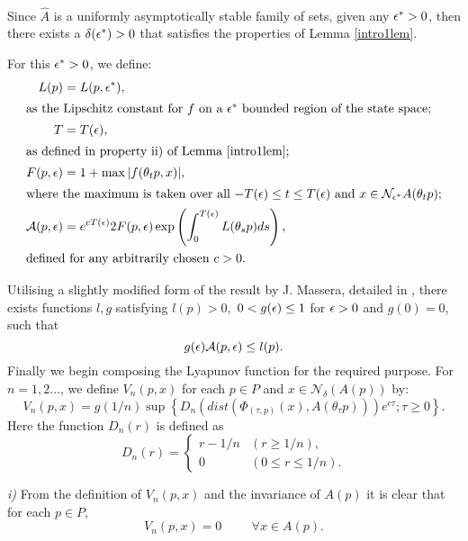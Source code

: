 \begin{prf} \hfill \\
  Since $\hat{A}$ is a uniformly asymptotically stable family of sets, given any
$\epsilon^* > 0$, then there exists a $\delta(\epsilon^*) > 0$ that satisfies the properties
of Lemma \ref{intro1lem}.

For this $\epsilon^*>0$, we define:
\begin{align*}
  L(p) &= L(p, \epsilon^*), \\
\intertext{as the Lipschitz constant for $f$ on a $\epsilon^*$ bounded region of
the state space;}
 T &= T( \epsilon ), \\
\intertext{as defined in property ii) of Lemma \ref{intro1lem};}
  F(p, \epsilon)  &= 1 + \max |f(\theta_t p,x)|, \\
\intertext{where the maximum is taken over all $-T(\epsilon) \leq t \leq T(\epsilon)$ and $x
\in \mathcal{N}_{\epsilon^*}A(\theta_t p)$;}
  \mathcal{A}(p, \epsilon) &= e^{cT(\epsilon)}2 F(p, \epsilon) \exp \left( \int_0^{T(\epsilon)}
        L(\theta_s p)ds \right), \\
\intertext{defined for any arbitrarily chosen $c> 0$.}
\end{align*}

  Utilising a slightly modified form of the result by J. Massera, detailed
  in \cite{Yo66}, there exists functions $l, g$ satisfying $l(p) > 0,$ $0 < g(\epsilon)
  \leq 1$ for $\epsilon > 0$ and $g(0) = 0$, such that
\begin{equation} \label{eqmass}
   g(\epsilon)\mathcal{A}(p,\epsilon) \leq l(p).
\end{equation}
  Finally we begin composing the Lyapunov function for the required purpose. For
$n = 1, 2 \dots$, we define $V_n(p, x)$ for each $p \in P$   and $x \in
\mathcal{N}_{\delta}(A(p))$ by:
\begin{equation*}
  V_n(p, x) = g(1/n) \sup \left\{ D_n( dist( \Phi_{(\tau, p)}(x),
  A(\theta_{\tau} p) ) ) e^{c \tau } ; \tau \geq 0 \right\}.
  \end{equation*}
  Here the function $D_n( r )$ is defined as
  \begin{equation*}
  D_n( r ) = \begin{cases}
  r - 1/n & ( r \geq 1/n ), \\
  0 & ( 0 \leq r \leq 1/n ).
  \end{cases}
  \end{equation*}

  {\em i)}
  From the definition of $V_n(p, x)$ and the invariance of $A(p)$ it is clear
  that for each $p \in P$,
  \begin{equation}
  V_n(p, x) = 0 \hspace{1cm} \forall x \in A(p).
  \end{equation}


\end{prf}
